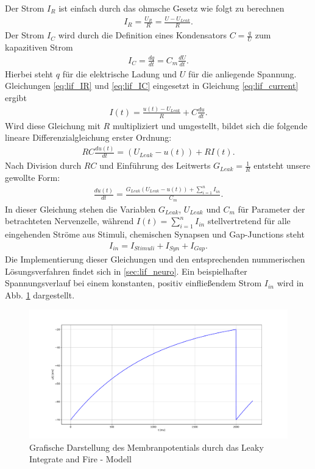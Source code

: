 	Der Strom $I_R$ ist einfach durch das ohmsche Gesetz wie folgt zu berechnen
	\begin{align}
		\label{eq:lif_IR}
		I_R = \frac{U_R}{R} = \frac{U - U_{Leak}}{R}\text{.}
	\end{align}
	Der Strom $I_C$ wird durch die Definition eines Kondensators $C = \tfrac{q}{U}$ zum kapazitiven Strom 
	\begin{align}
		\label{eq:lif_IC}
		I_C = \frac{dq}{dt} = C_m \frac{dU}{dt}\text{.}
	\end{align}
	Hierbei steht $q$ für die elektrische Ladung und $U$ für die anliegende Spannung.\\
	Gleichungen \ref{eq:lif_IR} und \ref{eq:lif_IC} eingesetzt in Gleichung \ref{eq:lif_current} ergibt
	\begin{align}
		\label{eq:lif_I}
		I(t) = \frac{u(t) - U_{Leak}}{R} + C\frac{du}{dt}\text{.}
	\end{align}
	Wird diese Gleichung mit $R$ multipliziert und umgestellt, bildet sich die folgende lineare Differenzialgleichung erster Ordnung:
	\begin{align}
		\label{eq:lif_nd}
		R C \frac{du(t)}{dt} = (U_{Leak} - u(t)) + R I(t)\text{.}
	\end{align}
	Nach Division durch $RC$ und Einführung des Leitwerts $G_{Leak} = \tfrac{1}{R}$ entsteht unsere gewollte Form:
	\begin{align}
		\label{eq:lif}
		\frac{du(t)}{dt} = \frac{G_{Leak}(U_{Leak} - u(t)) + \sum_{i = 1}^{n}{I_{in}}}{C_m}\text{.}
	\end{align}
	In dieser Gleichung stehen die Variablen $G_{Leak}$, $U_{Leak}$ und $C_m$ für Parameter der betrachteten Nervenzelle, während $I(t) = \sum_{i = 1}^{n}{I_{in}}$ stellvertretend für alle eingehenden Ströme aus Stimuli, chemischen Synapsen und Gap-Junctions steht
	\begin{align}
		\label{eq:lif_current_in}
		I_{in} = I_{Stimuli} + I_{Syn} + I_{Gap}\text{.}
	\end{align}
	Die Implementierung dieser Gleichungen und den entsprechenden nummerischen Lösungsverfahren findet sich in \ref{sec:lif_neuro}. Ein beispielhafter Spannungsverlauf bei einem konstanten, positiv einfließendem Strom $I_{in}$ wird in Abb. \ref{fig:simple_lif} dargestellt.
	\begin{figure}[h]
		\centering
		\includegraphics[width=12cm]{figures/chap_lif/Simple_LIF.pdf}
		\caption{Grafische Darstellung des Membranpotentials durch das Leaky Integrate and Fire - Modell}
		\label{fig:simple_lif}
	\end{figure}
